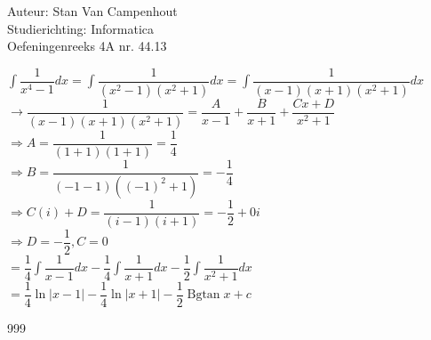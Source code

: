 \documentclass[a4paper]{article}
\begin{document}
  
\noindent \large Auteur: Stan Van Campenhout \\
\noindent \large Studierichting:  Informatica\\
\noindent \large Oefeningenreeks 4A nr. 44.13\\

\medskip

\normalsize

$ \displaystyle\int\dfrac{1}{x^4-1}dx = \displaystyle\int\dfrac{1}{\left(x^2-1\right)\left(x^2+1\right)}dx =  \displaystyle\int\dfrac{1}{\left(x-1\right)\left(x+1\right)\left(x^2+1\right)}dx $\\

$ \rightarrow \dfrac{1}{\left(x-1\right)\left(x+1\right)\left(x^2+1\right)} = \dfrac{A}{x-1}+\dfrac{B}{x+1}+\dfrac{Cx+D}{x^2+1} $\\

$ \Rightarrow A = \dfrac{1}{\left(1+1\right)\left(1+1\right)} = \dfrac{1}{4} $\\

$ \Rightarrow B = \dfrac{1}{\left(-1-1\right)\left(\left(-1\right)^2+1\right)} = -\dfrac{1}{4} $\\

$ \Rightarrow C\left(i\right) + D = \dfrac{1}{\left(i-1\right)\left(i+1\right)} = -\dfrac{1}{2} + 0i $\\

$ \Rightarrow D = -\dfrac{1}{2}, C = 0 $\\

$ = \dfrac{1}{4}\displaystyle\int\dfrac{1}{x-1}dx-\dfrac{1}{4}\displaystyle\int\dfrac{1}{x+1}dx-\dfrac{1}{2}\displaystyle\int\dfrac{1}{x^2+1}dx $\\

$ = \dfrac{1}{4}\ln|x-1|-\dfrac{1}{4}\ln|x+1|-\dfrac{1}{2}\operatorname{Bgtan}x + c $\\

\begin{thebibliography}{999}
\end{thebibliography}
\end{document}
